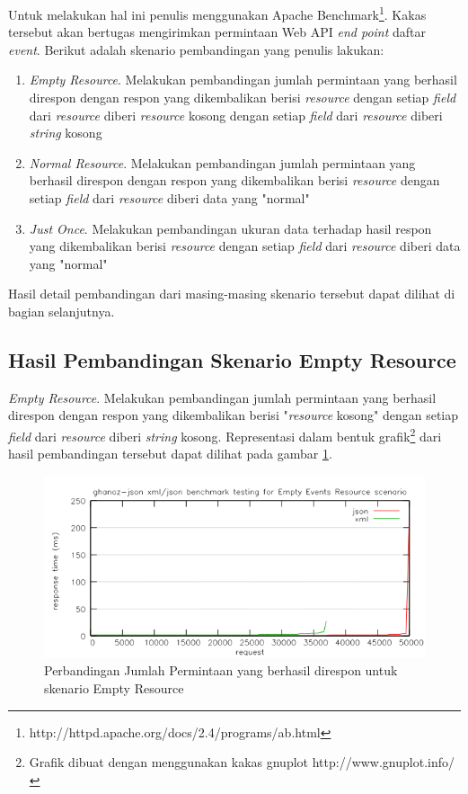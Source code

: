 \documentclass{llncs}
\begin{document}
Untuk melakukan hal ini penulis menggunakan Apache Benchmark\footnote{http://httpd.apache.org/docs/2.4/programs/ab.html}. Kakas tersebut akan bertugas mengirimkan permintaan Web API \textit{end point} daftar \textit{event}. Berikut adalah skenario pembandingan yang penulis lakukan:

\begin{enumerate}
  \item \textit{Empty Resource}. Melakukan pembandingan jumlah permintaan yang berhasil direspon dengan respon yang dikembalikan berisi \textit{resource} dengan setiap \textit{field} dari \textit{resource} diberi \textit{resource} kosong dengan setiap \textit{field} dari \textit{resource} diberi \textit{string} kosong
  \item \textit{Normal Resource}. Melakukan pembandingan jumlah permintaan yang berhasil direspon dengan respon yang dikembalikan berisi \textit{resource} dengan setiap \textit{field} dari \textit{resource} diberi data yang "normal"
  \item \textit{Just Once}. Melakukan pembandingan ukuran data terhadap hasil respon yang dikembalikan berisi \textit{resource} dengan setiap \textit{field} dari \textit{resource} diberi data yang "normal"
\end{enumerate}

Hasil detail pembandingan dari masing-masing skenario tersebut dapat dilihat di bagian selanjutnya.

\subsection{Hasil Pembandingan Skenario Empty Resource}

\onehalfspacing \textit{Empty Resource}. Melakukan pembandingan jumlah permintaan yang berhasil direspon dengan respon yang dikembalikan berisi "\textit{resource} kosong" dengan setiap \textit{field} dari \textit{resource} diberi \textit{string} kosong. Representasi dalam bentuk grafik\footnote{Grafik dibuat dengan menggunakan kakas gnuplot http://www.gnuplot.info/} dari hasil pembandingan tersebut dapat dilihat pada gambar \ref{benchmark-empty-resource}.

\begin{figure}[htp]
\centering
\includegraphics[scale=0.65]{images/benchmark-empty-resource.png}
\caption{Perbandingan Jumlah Permintaan yang berhasil direspon untuk skenario Empty Resource}
\label{benchmark-empty-resource}
\end{figure}
\end{document}
